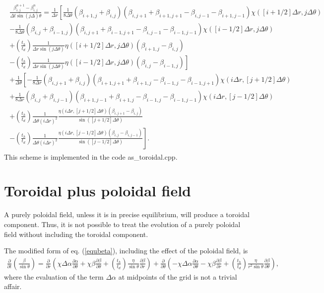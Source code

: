 \documentclass[letterpaper,10pt]{article}
\newcommand{\pp}{\partial}
\newcommand{\D}{\displaystyle}
\begin{document}
\begin{eqnarray}
\begin{aligned}
\frac{\beta_{i,j}^{n+1}-\beta_{i,j}^{n}}{\Delta t\sin (j\Delta)\theta}=\D\frac{1}{\Delta r}\left[\frac{1}{8\Delta\theta}(\beta_{i+1,j}+\beta_{i,j})(\beta_{i,j+1}+\beta_{i+1,j+1}-\beta_{i,j-1}-\beta_{i+1,j-1})\chi([i+1/2]\Delta r,j\Delta\theta)\right.\\
\left.-\frac{1}{8\Delta\theta}(\beta_{i,j}+\beta_{i-1,j})(\beta_{i,j+1}+\beta_{i-1,j+1}-\beta_{i,j-1}-\beta_{i-1,j-1})\chi([i-1/2]\Delta r,j\Delta\theta)\right.\\
+\left.\left(\frac{t_h}{t_d}\right)\frac{1}{\Delta r\sin(j\Delta\theta)}\eta([i+1/2]\Delta r,j\Delta\theta)(\beta_{i+1,j}-\beta_{i,j})\right.\\
\left.-\left(\frac{t_h}{t_d}\right)\frac{1}{\Delta r\sin(j\Delta\theta)}\eta([i-1/2]\Delta r,j\Delta\theta)(\beta_{i,j}-\beta_{i-1,j})\right]\\
+\frac{1}{\Delta \theta}\left[-\frac{1}{8\Delta r}(\beta_{i,j+1}+\beta_{i,j})(\beta_{i+1,j+1}+\beta_{i+1,j}-\beta_{i-1,j}-\beta_{i-1,j+1})\chi(i\Delta r,[j+1/2]\Delta\theta)\right.\\
\left.+\frac{1}{8\Delta r}(\beta_{i,j}+\beta_{i,j-1})(\beta_{i+1,j-1}+\beta_{i+1,j}-\beta_{i-1,j}-\beta_{i-1,j-1})\chi(i\Delta r,[j-1/2]\Delta\theta)\right.\\
+\left.\left(\frac{t_h}{t_d}\right)\frac{1}{\Delta \theta(i\Delta r)^2}\frac{\eta(i\Delta r,[j+1/2]\Delta\theta)(\beta_{i,j+1}-\beta_{i,j})}{\sin([j+1/2]\Delta\theta)}\right.\\
\left.-\left(\frac{t_h}{t_d}\right)\frac{1}{\Delta \theta(i\Delta r)^2}\frac{\eta(i\Delta r,[j-1/2]\Delta\theta)(\beta_{i,j}-\beta_{i,j-1})}{\sin([j-1/2]\Delta\theta)}\right].
\end{aligned}
\end{eqnarray}
This scheme is implemented in the code as\_toroidal.cpp.
\section{Toroidal plus poloidal field}
A purely poloidal field, unless it is in precise equilibrium, will produce a toroidal component. Thus, it is not possible to treat the evolution of a purely poloidal field without including the toroidal component.

The modified form of eq. (\ref{equbeta}), including the effect of the poloidal field, is
\begin{eqnarray}
\frac{\pp}{\pp t}\left(\frac{\beta}{\sin\theta}\right)=\frac{\pp}{\pp r}\left(\chi\Delta\alpha\frac{\pp\alpha}{\pp\theta}+\chi\beta\frac{\pp \beta}{\pp\theta}+\left(\frac{t_h}{t_d}\right)\frac{\eta}{\sin\theta}\frac{\pp\beta}{\pp r}\right)+\frac{\pp}{\pp\theta}\left(-\chi\Delta\alpha\frac{\pp\alpha}{\pp\theta}-\chi\beta\frac{\pp\beta}{\pp r}+\left(\frac{t_h}{t_d}\right)\frac{\eta}{r^2\sin\theta}\frac{\pp\beta}{\pp\theta}\right),
\end{eqnarray}
where the evaluation of the term $\Delta\alpha$ at midpoints of the grid is not a trivial affair.
\end{document}
